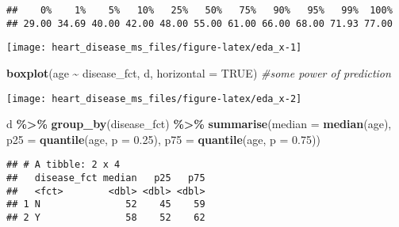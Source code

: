 \documentclass[
]{article}
\newenvironment{Shaded}{\begin{snugshade}}{\end{snugshade}}
\newcommand{\AttributeTok}[1]{\textcolor[rgb]{0.13,0.29,0.53}{#1}}
\newcommand{\CommentTok}[1]{\textcolor[rgb]{0.56,0.35,0.01}{\textit{#1}}}
\newcommand{\ConstantTok}[1]{\textcolor[rgb]{0.56,0.35,0.01}{#1}}
\newcommand{\FloatTok}[1]{\textcolor[rgb]{0.00,0.00,0.81}{#1}}
\newcommand{\FunctionTok}[1]{\textcolor[rgb]{0.13,0.29,0.53}{\textbf{#1}}}
\newcommand{\NormalTok}[1]{#1}
\newcommand{\SpecialCharTok}[1]{\textcolor[rgb]{0.81,0.36,0.00}{\textbf{#1}}}
\begin{document}
\begin{verbatim}
##    0%    1%    5%   10%   25%   50%   75%   90%   95%   99%  100% 
## 29.00 34.69 40.00 42.00 48.00 55.00 61.00 66.00 68.00 71.93 77.00
\end{verbatim}

\begin{Shaded}
\end{Shaded}

\begin{center}\texttt{[image: heart\_disease\_ms\_files/figure-latex/eda\_x-1]} \end{center}

\begin{Shaded}
\begin{Highlighting}[]
\FunctionTok{boxplot}\NormalTok{(age }\SpecialCharTok{\textasciitilde{}}\NormalTok{ disease\_fct, d, }\AttributeTok{horizontal =} \ConstantTok{TRUE}\NormalTok{) }\CommentTok{\#some power of prediction }
\end{Highlighting}
\end{Shaded}

\begin{center}\texttt{[image: heart\_disease\_ms\_files/figure-latex/eda\_x-2]} \end{center}

\begin{Shaded}
\begin{Highlighting}[]
\NormalTok{d }\SpecialCharTok{\%\textgreater{}\%}
  \FunctionTok{group\_by}\NormalTok{(disease\_fct) }\SpecialCharTok{\%\textgreater{}\%}
  \FunctionTok{summarise}\NormalTok{(}\AttributeTok{median =} \FunctionTok{median}\NormalTok{(age),}
            \AttributeTok{p25 =} \FunctionTok{quantile}\NormalTok{(age, }\AttributeTok{p =} \FloatTok{0.25}\NormalTok{),}
            \AttributeTok{p75 =} \FunctionTok{quantile}\NormalTok{(age, }\AttributeTok{p =} \FloatTok{0.75}\NormalTok{)) }
\end{Highlighting}
\end{Shaded}

\begin{verbatim}
## # A tibble: 2 x 4
##   disease_fct median   p25   p75
##   <fct>        <dbl> <dbl> <dbl>
## 1 N               52    45    59
## 2 Y               58    52    62
\end{verbatim}
\end{document}
